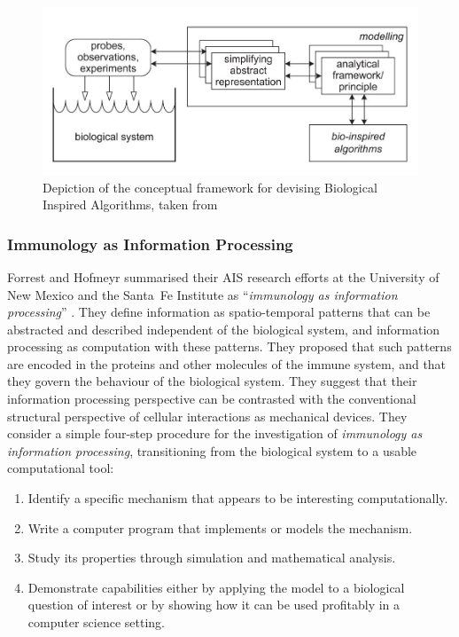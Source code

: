 \begin{figure}[ht]
	\centering
	\includegraphics[scale=0.70]{Background/meth-conceptualframework}
	\caption{Depiction of the conceptual framework for devising Biological Inspired Algorithms, taken from \cite{Stepney2005}}
	\label{pic:meth-conceptualframework}
\end{figure}

%
%
\subsubsection{Immunology as Information Processing}
\label{subsec:iip}
Forrest and Hofmeyr summarised their AIS research efforts at the University of New Mexico and the Santa~Fe Institute as ``\emph{immunology as information processing}'' \cite{Forrest2001}. They define information as spatio-temporal patterns that can be abstracted and described independent of the biological system, and information processing as computation with these patterns. They proposed that such patterns are encoded in the proteins and other molecules of the immune system, and that they govern the behaviour of the biological system. They suggest that their information processing perspective can be contrasted with the conventional structural perspective of cellular interactions as mechanical devices. They consider a simple four-step procedure for the investigation of \emph{immunology as information processing}, transitioning from the biological system to a usable computational tool:

\begin{enumerate}
	\item Identify a specific mechanism that appears to be interesting computationally.
	\item Write a computer program that implements or models the mechanism.
	\item Study its properties through simulation and mathematical analysis.
	\item Demonstrate capabilities either by applying the model to a biological question of interest or by showing how it can be used profitably in a computer science setting.
\end{enumerate}

